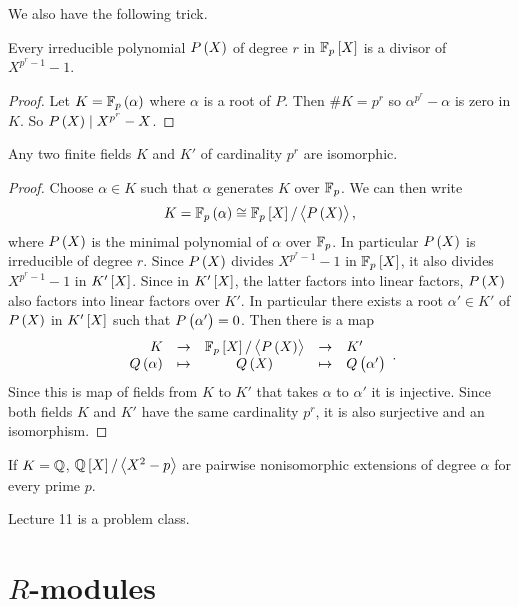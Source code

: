 We also have the following trick.

\begin{lemma}
Every irreducible polynomial $ P\br{X} $ of degree $ r $ in $ \FF_p\sbr{X} $ is a divisor of $ X^{p^r - 1} - 1 $.
\end{lemma}

\begin{proof}
Let $ K = \FF_p\br{\alpha} $ where $ \alpha $ is a root of $ P $. Then $ \#K = p^r $ so $ \alpha^{p^r} - \alpha $ is zero in $ K $. So $ P\br{X} \mid X^{p^r} - X $.
\end{proof}

\begin{corollary}
Any two finite fields $ K $ and $ K' $ of cardinality $ p^r $ are isomorphic.
\end{corollary}

\begin{proof}
Choose $ \alpha \in K $ such that $ \alpha $ generates $ K $ over $ \mathbb{F}_p $. We can then write
$$ K = \FF_p\br{\alpha} \cong \FF_p\sbr{X} / \abr{P\br{X}}, $$
where $ P\br{X} $ is the minimal polynomial of $ \alpha $ over $ \mathbb{F}_p $. In particular $ P\br{X} $ is irreducible of degree $ r $. Since $ P\br{X} $ divides $ X^{p^r - 1} - 1 $ in $ \FF_p\sbr{X} $, it also divides $ X^{p^r - 1} - 1 $ in $ K'\sbr{X} $. Since in $ K'\sbr{X} $, the latter factors into linear factors, $ P\br{X} $ also factors into linear factors over $ K' $. In particular there exists a root $ \alpha' \in K' $ of $ P\br{X} $ in $ K'\sbr{X} $ such that $ P\br{\alpha'} = 0 $. Then there is a map
$$
\begin{array}{rcccl}
K & \to & \FF_p\sbr{X} / \abr{P\br{X}} & \to & K' \\
Q\br{\alpha} & \mapsto & Q\br{X} & \mapsto & Q\br{\alpha'}
\end{array}.
$$
Since this is map of fields from $ K $ to $ K' $ that takes $ \alpha $ to $ \alpha' $ it is injective. Since both fields $ K $ and $ K' $ have the same cardinality $ p^r $, it is also surjective and an isomorphism.
\end{proof}

If $ K = \mathbb{Q} $, $ \QQ\sbr{X} / \abr{X^2 - p} $ are pairwise nonisomorphic extensions of degree $ \alpha $ for every prime $ p $.


Lecture 11 is a problem class.

\pagebreak

\section{\texorpdfstring{$ R $}{R}-modules}

